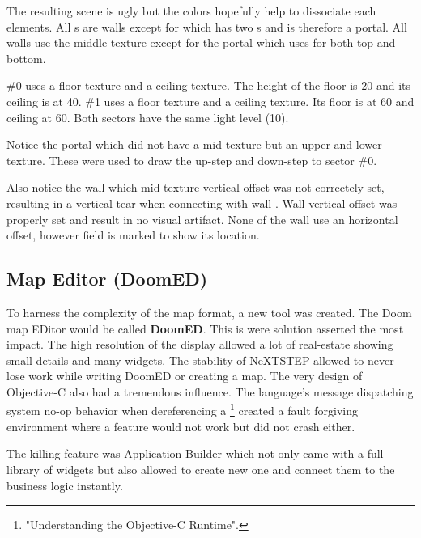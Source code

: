 \par
The resulting scene is ugly but the colors hopefully help to dissociate each elements. All s are walls except for  which has two s and is therefore a portal. All walls use the  middle texture except for the portal which uses  for both top and bottom.\\
\par
{} \#0 uses a  floor texture and a  ceiling texture. The height of the floor is 20 and its ceiling is at 40.  \#1 uses a  floor texture and a  ceiling texture. Its floor is at 60 and ceiling at 60. Both sectors have the same light level (10).\\
\par
   Notice the portal  which did not have a mid-texture but an upper and lower texture. These were used to draw the up-step and down-step to sector \#0.\\
\par
Also notice the wall  which mid-texture vertical offset was not correctely set, resulting in a vertical tear when connecting with wall . Wall  vertical offset was properly set and result in no visual artifact. None of the wall use an horizontal offset, however field is marked  to show its location.\\ 
\pagebreak



\subsection{Map Editor (DoomED)}
To harness the complexity of the map format, a new tool was created. The Doom map EDitor would be called \textbf{DoomED}. This is were \NeXT solution asserted the most impact. The high resolution of the display allowed a lot of real-estate showing small details and many widgets. The stability of NeXTSTEP allowed to never lose work while writing DoomED or creating a map.
The very design of Objective-C also had a tremendous influence. The language's message dispatching system no-op behavior when dereferencing a \footnote{"Understanding the Objective-C Runtime".} created a fault forgiving environment where a feature would not work but did not crash either.\\
\par   
The killing feature was Application Builder which not only came with a full library of widgets but also allowed to create new one and connect them to the business logic instantly.\\
\par
{}
\par

